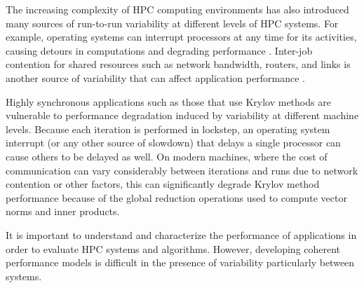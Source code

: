\documentclass[sigconf]{acmart}
\begin{document}
The increasing complexity of HPC computing environments has also introduced many sources of run-to-run variability at different levels of HPC systems. 
For example, operating systems can interrupt processors at any time for its activities, causing detours in computations and degrading performance \cite{hoefler2010characterizing, FerreiraBridgesBrightwell08}.
Inter-job contention for shared resources such as network bandwidth, routers, and links is another source of variability that can affect application performance \cite{parker2017early, chunduri2017run}. 

Highly synchronous applications such as those that use Krylov methods are vulnerable to performance degradation induced by variability at different machine levels. 
Because each iteration is performed in lockstep, an operating system interrupt (or any other source of slowdown) that delays a single processor can cause others to be delayed as well.
On modern machines, where the cost of communication can vary considerably between iterations and runs due to network contention or other factors, this can significantly degrade Krylov method performance because of the global reduction operations used to compute vector norms and inner products.

It is important to understand and characterize the performance of applications in order to evaluate HPC systems and algorithms. 
However, developing coherent performance models is difficult in the presence of variability \cite{beckman2006influence, HoeflerLumsdaineRehm07} particularly between systems. 
\end{document}

